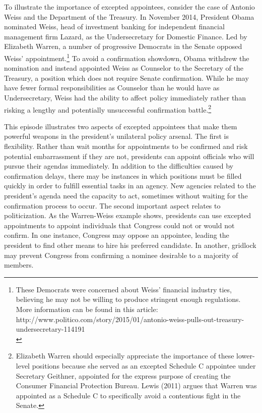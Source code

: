 \documentclass[12pt]{article}
\begin{document}
	To illustrate the importance of excepted appointees, consider the case of Antonio Weiss and the Department of the Treasury. In November 2014, President Obama nominated Weiss, head of investment banking for independent financial management firm Lazard, as the Undersecretary for Domestic Finance. Led by Elizabeth Warren, a number of progressive Democrats in the Senate opposed Weiss' appointment.\footnote{ These Democrats were concerned about Weiss' financial industry ties, believing he may not be willing to produce stringent enough regulations. More information can be found in this article: http://www.politico.com/story/2015/01/antonio-weiss-pulls-out-treasury-undersecretary-114191\\} To avoid a confirmation showdown, Obama withdrew the nomination and instead appointed Weiss as Counselor to the Secretary of the Treasury, a position which does not require Senate confirmation. While he may have fewer formal responsibilities as Counselor than he would have as Undersecretary, Weiss had the ability to affect policy immediately rather than risking a lengthy and potentially unsuccessful confirmation battle.\footnote{Elizabeth Warren should especially appreciate the importance of these lower-level positions because she served as an excepted Schedule C appointee under Secretary Geithner, appointed for the express purpose of creating the Consumer Financial Protection Bureau. Lewis (2011) argues that Warren was appointed as a Schedule C to specifically avoid a contentious fight in the Senate.}
	
	This episode illustrates two aspects of excepted appointees that make them powerful weapons in the president's unilateral policy arsenal. The first is flexibility. Rather than wait months for appointments to be confirmed and risk potential embarrassment if they are not, presidents can appoint officials who will pursue their agendas immediately.  In addition to the difficulties caused by confirmation delays, there may be instances in which positions must be filled quickly in order to fulfill essential tasks in an agency. New agencies related to the president's agenda need the capacity to act, sometimes without waiting for the confirmation process to occur. The second important aspect relates to politicization. As the Warren-Weiss example shows, presidents can use excepted appointments to appoint individuals that Congress could not or would not confirm. In one instance, Congress may oppose an appointee, leading the president to find other means to hire his preferred candidate. In another, gridlock may prevent Congress from confirming a nominee desirable to a majority of members.
	
\end{document}
